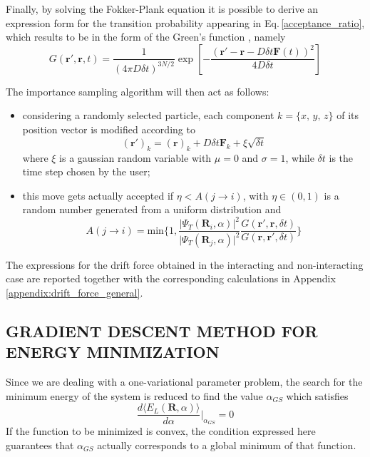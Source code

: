 Finally, by solving the Fokker-Plank equation it is possible to derive an expression form for the transition probability appearing in Eq.\,\ref{acceptance_ratio}, which results to be in the form of the Green's function \cite{lectures2015}, namely
\begin{equation*}
    G(\bm{r}', \bm{r}, t) = \frac{1}{\left (4 \pi D \delta t\right)^{3N/2}} \exp \left[ - \frac{ \left( \bm{r}' - \bm{r} - D\delta t \bm{F}(t)\right)^2}{4D\delta t}  \right]
\end{equation*}

The importance sampling algorithm will then act as follows:
\begin{itemize}
    \item considering a randomly selected particle, each  component $k = \{x,\,y,\,z\}$ of its position vector is modified according to
    \begin{equation*}
        (\bm{r}')_k = (\bm{r})_k + D \delta t \bm{F}_k + \xi \sqrt{\delta t}
    \end{equation*}
    where $\xi$ is a gaussian random variable with $\mu = 0$ and $\sigma=1$, while $\delta t$ is the time step chosen by the user;
    \item this move gets actually accepted if $\eta < A(j\rightarrow i)$, with $\eta \in (0,1)$ is a random number generated from a uniform distribution and
    \begin{equation}
        A(j \rightarrow i) = \text{min} \bigg\{ 1, \frac{\vert \Psi_T(\bm{R}_i, \alpha)\vert^2}{\vert \Psi_T(\bm{R}_j, \alpha)\vert^2} \frac{G(\bm{r}', \bm{r}, \delta t)}{G(\bm{r}, \bm{r}', \delta t)} \bigg\}
        \label{acceptance_importance}
    \end{equation}
\end{itemize}

The expressions for the drift force obtained in the interacting and non-interacting case are reported together with the corresponding calculations in Appendix \ref{appendix:drift_force_general}.


\subsection{GRADIENT DESCENT METHOD FOR ENERGY MINIMIZATION}
Since we are dealing with a one-variational parameter problem, the search for the minimum energy of the system is reduced to find the value $\alpha_{GS}$ which satisfies
\begin{equation}
    \frac{d \langle E_L(\bm{R},\alpha) \rangle}{d \alpha} \bigg\vert_{\alpha_{GS}} = 0
    \label{null_derivative}
\end{equation}
If the function to be minimized is convex, the condition expressed here guarantees that $\alpha_{GS}$ actually corresponds to a global minimum of that function. 

